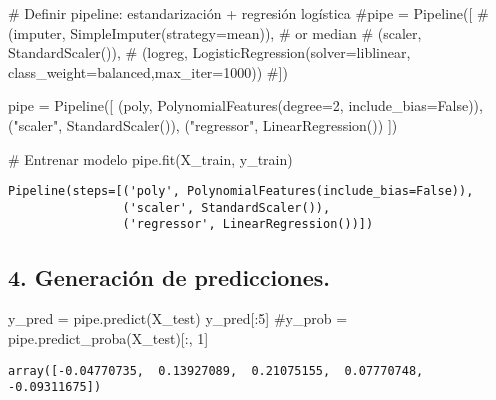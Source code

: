 \documentclass[
  letterpaper,
  DIV=11,
  numbers=noendperiod]{scrartcl}
\newenvironment{Shaded}{\begin{snugshade}}{\end{snugshade}}
\newcommand{\CommentTok}[1]{\textcolor[rgb]{0.37,0.37,0.37}{#1}}
\newcommand{\DecValTok}[1]{\textcolor[rgb]{0.68,0.00,0.00}{#1}}
\newcommand{\NormalTok}[1]{\textcolor[rgb]{0.00,0.23,0.31}{#1}}
\newcommand{\OperatorTok}[1]{\textcolor[rgb]{0.37,0.37,0.37}{#1}}
\newcommand{\StringTok}[1]{\textcolor[rgb]{0.13,0.47,0.30}{#1}}
\newcommand{\VariableTok}[1]{\textcolor[rgb]{0.07,0.07,0.07}{#1}}
\begin{document}
\begin{Shaded}
\begin{Highlighting}[]
\CommentTok{\# Definir pipeline: estandarización + regresión logística}
\CommentTok{\#pipe = Pipeline([}
\CommentTok{\#    (\textquotesingle{}imputer\textquotesingle{}, SimpleImputer(strategy=\textquotesingle{}mean\textquotesingle{})),  \# or \textquotesingle{}median\textquotesingle{}}
\CommentTok{\#    (\textquotesingle{}scaler\textquotesingle{}, StandardScaler()),}
\CommentTok{\#    (\textquotesingle{}logreg\textquotesingle{}, LogisticRegression(solver=\textquotesingle{}liblinear\textquotesingle{}, class\_weight=\textquotesingle{}balanced\textquotesingle{},max\_iter=1000))}
\CommentTok{\#])}

\NormalTok{pipe }\OperatorTok{=}\NormalTok{ Pipeline([}
\NormalTok{    (}\StringTok{\textquotesingle{}poly\textquotesingle{}}\NormalTok{, PolynomialFeatures(degree}\OperatorTok{=}\DecValTok{2}\NormalTok{, include\_bias}\OperatorTok{=}\VariableTok{False}\NormalTok{)),}
\NormalTok{    (}\StringTok{"scaler"}\NormalTok{, StandardScaler()),}
\NormalTok{    (}\StringTok{"regressor"}\NormalTok{, LinearRegression())}
\NormalTok{])}

\CommentTok{\# Entrenar modelo}
\NormalTok{pipe.fit(X\_train, y\_train)}
\end{Highlighting}
\end{Shaded}

\begin{verbatim}
Pipeline(steps=[('poly', PolynomialFeatures(include_bias=False)),
                ('scaler', StandardScaler()),
                ('regressor', LinearRegression())])
\end{verbatim}

\subsection{4. Generación de
predicciones.}\label{generaciuxf3n-de-predicciones.}

\begin{Shaded}
\begin{Highlighting}[]
\NormalTok{y\_pred }\OperatorTok{=}\NormalTok{ pipe.predict(X\_test)}
\NormalTok{y\_pred[:}\DecValTok{5}\NormalTok{]}
\CommentTok{\#y\_prob = pipe.predict\_proba(X\_test)[:, 1]}
\end{Highlighting}
\end{Shaded}

\begin{verbatim}
array([-0.04770735,  0.13927089,  0.21075155,  0.07770748, -0.09311675])
\end{verbatim}
\end{document}
